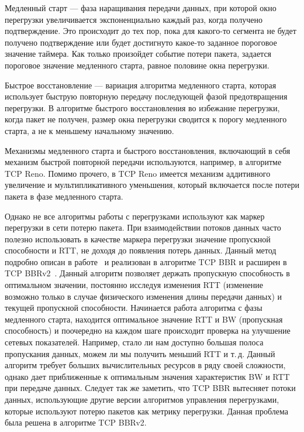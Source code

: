 Медленный старт --- фаза наращивания передачи данных, при которой окно
перегрузки увеличивается экспоненциально каждый раз, когда получено
подтверждение. Это происходит до тех пор, пока для какого-то сегмента не
будет получено подтверждение или будет достигнуто какое-то заданное
пороговое значение таймера. Как только произойдет событие потери пакета,
задается пороговое значение медленного старта, равное половине окна
перегрузки.

Быстрое восстановление --- вариация алгоритма медленного старта, которая
использует быструю повторную передачу последующей фазой предотвращения
перегрузки. В алгоритме быстрого восстановления во избежание
перегрузки, когда пакет не получен, размер окна перегрузки сводится к
порогу медленного старта, а не к меньшему начальному значению.

Механизмы медленного старта и быстрого восстановления, включающий в себя
механизм быстрой повторной передачи используются, например, в алгоритме
TCP Reno. Помимо прочего, в TCP Reno имеется механизм аддитивного
увеличение и мультипликативного уменьшения, который включается после
потери пакета в фазе медленного старта.

Однако не все алгоритмы работы с перегрузками используют как маркер
перегрузки в сети потерю пакета. При взаимодействии потоков данных
часто полезно использовать в качестве маркера перегрузки значение
пропускной способности и RTT, не доходя до появления потерь данных. Данный
метод подробно описан в работе~\cite{bbrv1} и реализован в алгоритме
TCP BBR и расширен в TCP BBRv2~\cite{bbrv2}. Данный алгоритм позволяет
держать пропускную способность в оптимальном значении, постоянно
исследуя изменения RTT (изменение возможно только в случае физического
изменения длины передачи данных) и текущей пропускной
способности. Начинается работа алгоритма с фазы медленного старта,
находится оптимальное значение RTT и BW (пропускная способность) и
поочередно на каждом шаге происходит проверка на улучшение сетевых
показателей. Например, стало ли нам доступно большая полоса
пропускания данных, можем ли мы получить меньший RTT и т.\,д. Данный
алгоритм требует больших вычислительных ресурсов в ряду своей
сложности, однако дает приближенные к оптимальным значения
характеристик BW и RTT при передаче данных. Следует так же заметить,
что TCP BBR вытесняет потоки данных, использующие другие версии
алгоритмов управления перегрузками, которые используют потерю пакетов
как метрику перегрузки. Данная проблема была решена в алгоритме TCP
BBRv2.

